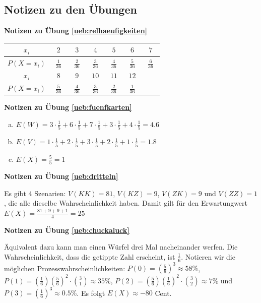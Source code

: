 \documentclass[%
<<<<<<< Updated upstream
<<<<<<< Updated upstream
11pt,%
twoside,%
titlepage,%
german,%
=======
=======
>>>>>>> Stashed changes
11pt,%
twoside,%
titlepage,%
swissgerman,%
<<<<<<< Updated upstream
>>>>>>> Stashed changes
=======
>>>>>>> Stashed changes
headsepline%
]{scrartcl}
\newcommand{\faReturnGray}{\textcolor{gray}{\faMailReply}} %
\newcommand{\spaltenheight}{\rule{0mm}{3ex}}
\newcommand{\spaltensep}{\\[1ex]}
\theoremstyle{definition}
\theoremstyle{plain}
\newcommand{\concatueb}[1]{ueb:#1}%
\newcommand{\concatlsg}[1]{lsg:#1}%
\newenvironment{lsg}[1]{%
    \par\noindent\textbf{Notizen zu Übung \ref{\concatueb{#1}}}\label{\concatlsg{#1}}
    \hfill\hyperref[\concatueb{#1}]{\faReturnGray}\par %
}{%
    \par%
}
\newcommand{\concatueb}[1]{ueb:#1}%
\newcommand{\concatlsg}[1]{lsg:#1}%
\newenvironment{lsg}[1]{%
    \par\noindent\textbf{Notizen zu Übung \ref{\concatueb{#1}}.}%
    \label{\concatlsg{#1}}
}{%
    \par%
}
\begin{document}
\clearpage

\subsection{Notizen zu den Übungen}

\begin{lsg}{relhaeufigkeiten}
    \begin{center}
\begin{tabular}{|c|c|c|c|c|c|c|}
\hline
\rowcolor{Gray}\spaltenheight $\;\; x_i\;\;$ & $\;\;2\;\;$ & $\;\;3\;\;$ & $\;\;4\;\;$ & $\;\;5\;\;$ & $\;\;6\;\;$ & $\;\;7\;\;$\spaltensep \hline
\rowcolor{lightyellow}\rule{0mm}{3ex} $P(X=x_i)$ & $\frac{1}{36}$ & $\frac{2}{36}$ & $\frac{3}{36}$ & $\frac{4}{36}$ & $\frac{5}{36}$ & $\frac{6}{36}$\\[1ex] \hline
\rowcolor{Gray}\spaltenheight $\;\; x_i\;\;$ & $\;\;8\;\;$ & $\;\;9\;\;$ & $\;10\;$ & $\;11\;$ & $\;12\;$ & \phantom{$\;12\;$}\spaltensep \hline
\rowcolor{lightyellow}\rule{0mm}{3ex} $P(X=x_i)$ & $\frac{5}{36}$ & $\frac{4}{36}$ & $\frac{3}{36}$ & $\frac{2}{36}$ & $\frac{1}{36}$ & \\[1ex] \hline
\end{tabular}
\end{center}
\end{lsg}
\begin{lsg}{fuenfkarten}
    \begin{enumerate}[a)]
        \item $E(W)=3\cdot\frac{1}{5}+6\cdot\frac{1}{5}+7\cdot\frac{1}{5}+3\cdot\frac{1}{5}+4\cdot\frac{1}{5}=4.6$
        \item $E(V)=1\cdot\frac{1}{5}+2\cdot\frac{1}{5}+3\cdot\frac{1}{5}+2\cdot\frac{1}{5}+1\cdot\frac{1}{5}=1.8$
        \item $E(X)=\frac{5}{5}=1$
    \end{enumerate}
\end{lsg}
\begin{lsg}{dritteln}
    Es gibt 4 Szenarien: $V(KK)=81$, $V(KZ)=9$, $V(ZK)=9$ und $V(ZZ)=1$, die alle dieselbe Wahrscheinlichkeit haben. Damit gilt für den Erwartungwert $E(X)=\frac{81+9+9+1}{4}=25$
\end{lsg}
\begin{lsg}{chuckaluck}
    Äquivalent dazu kann man einen Würfel drei Mal nacheinander werfen. Die Wahrscheinlichkeit, dass die getippte Zahl erscheint, ist $\frac{1}{6}$. Notieren wir die möglichen Prozesswahrscheinlichkeiten: $P(0)=(\frac{5}{6})^3\approx58\%$, $P(1)=(\frac{1}{6})(\frac{5}{6})^2\cdot\binom{3}{1}\approx35\%$, $P(2)=(\frac{5}{6})(\frac{1}{6})^2\cdot\binom{3}{2}\approx7\%$ und $P(3)=(\frac{1}{6})^3\approx0.5\%$. Es folgt $E(X)\approx-80$ Cent.
\end{lsg}
\end{document}
